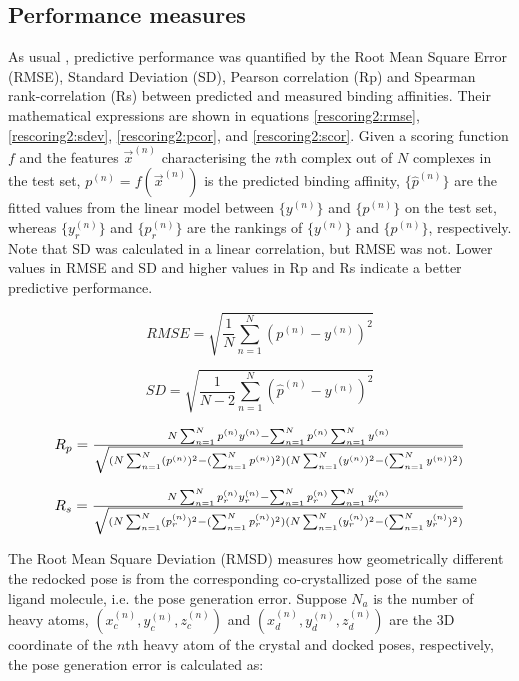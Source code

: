 \documentclass[twocolumn]{bmcart}
\begin{document}
\subsection*{Performance measures}

As usual \cite{1313}, predictive performance was quantified by the Root Mean Square Error (RMSE), Standard Deviation (SD), Pearson correlation (Rp) and Spearman rank-correlation (Rs) between predicted and measured binding affinities. Their mathematical expressions are shown in equations \ref{rescoring2:rmse}, \ref{rescoring2:sdev}, \ref{rescoring2:pcor}, and \ref{rescoring2:scor}. Given a scoring function $f$ and the features $\overrightarrow{x}^{(n)}$ characterising the $n$th complex out of $N$ complexes in the test set, $p^{(n)}=f(\overrightarrow{x}^{(n)})$ is the predicted binding affinity, $\{\hat{p}^{(n)}\}$ are the fitted values from the linear model between $\{y^{(n)}\}$ and $\{p^{(n)}\}$ on the test set, whereas $\{y_r^{(n)}\}$ and $\{p_r^{(n)}\}$ are the rankings of $\{y^{(n)}\}$ and $\{p^{(n)}\}$, respectively. Note that SD was calculated in a linear correlation, but RMSE was not. Lower values in RMSE and SD and higher values in Rp and Rs indicate a better predictive performance.

\begin{equation}
RMSE = \sqrt{\frac{1}{N}\sum_{n=1}^N(p^{(n)}-y^{(n)})^2}
\label{rescoring2:rmse}
\end{equation}

\begin{equation}
SD = \sqrt{\frac{1}{N-2}\sum_{n=1}^N(\hat{p}^{(n)}-y^{(n)})^2}
\label{rescoring2:sdev}
\end{equation}

\begin{equation}
\resizebox{.85\hsize}{!}{$R_p = \frac{N\sum_{n=1}^Np^{(n)}y^{(n)}-\sum_{n=1}^Np^{(n)}\sum_{n=1}^Ny^{(n)}}{\sqrt{(N\sum_{n=1}^N(p^{(n)})^2-(\sum_{n=1}^Np^{(n)})^2)(N\sum_{n=1}^N(y^{(n)})^2-(\sum_{n=1}^Ny^{(n)})^2)}}$}
\label{rescoring2:pcor}
\end{equation}

\begin{equation}
\resizebox{.85\hsize}{!}{$R_s = \frac{N\sum_{n=1}^Np_r^{(n)}y_r^{(n)}-\sum_{n=1}^Np_r^{(n)}\sum_{n=1}^Ny_r^{(n)}}{\sqrt{(N\sum_{n=1}^N(p_r^{(n)})^2-(\sum_{n=1}^Np_r^{(n)})^2)(N\sum_{n=1}^N(y_r^{(n)})^2-(\sum_{n=1}^Ny_r^{(n)})^2)}}$}
\label{rescoring2:scor}
\end{equation}

The Root Mean Square Deviation (RMSD) measures how geometrically different the redocked pose is from the corresponding co-crystallized pose of the same ligand molecule, i.e. the pose generation error. Suppose $N_a$ is the number of heavy atoms, $(x_c^{(n)}, y_c^{(n)}, z_c^{(n)})$ and $(x_d^{(n)}, y_d^{(n)}, z_d^{(n)})$ are the 3D coordinate of the $n$th heavy atom of the crystal and docked poses, respectively, the pose generation error is calculated as:
\end{document}

